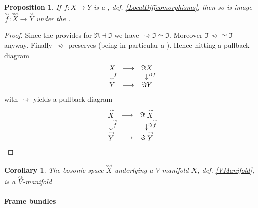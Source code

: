\documentclass[12pt,titlepage]{article}
\def\mathrlap{\mathpalette\mathrlapinternal}
\def\mathrlapinternal#1#2{\rlap{$\mathsurround=0pt#1{#2}$}}
\newcommand{\itexarray}[1]{\begin{matrix}#1\end{matrix}}
\theoremstyle{plain}
\newtheorem{prop}{Proposition}
\newtheorem{cor}{Corollary}
\theoremstyle{definition}
\theoremstyle{remark}
\begin{document}
\begin{prop}
\label{}\hypertarget{}{}
If $f \colon X \longrightarrow Y$ is a , def. \ref{LocalDiffeomorphisms}, then so is image $\stackrel{\rightsquigarrow}{f}\colon \stackrel{\rightsquigarrow}{X} \longrightarrow \stackrel{\rightsquigarrow}{Y}$ under the .
\end{prop}
\begin{proof}
Since the  provides  for $\Re\dashv \Im$ we have $\rightsquigarrow \Im \simeq \Im$. Moreover $\Im \rightsquigarrow \simeq \Im$ anyway. Finally $\rightsquigarrow$ preserves  (being in particular a ). Hence hitting a pullback diagram
\begin{displaymath}
\itexarray{
X &\longrightarrow& \Im X
\\
\downarrow^{\mathrlap{f}} && \downarrow^{\mathrlap{\Im f}}
\\
Y &\longrightarrow& \Im Y
}
\end{displaymath}
with $\rightsquigarrow$ yields a pullback diagram
\begin{displaymath}
\itexarray{
\stackrel{\rightsquigarrow}{X} &\longrightarrow& \Im \stackrel{\rightsquigarrow}{X}
\\
\downarrow^{\mathrlap{\stackrel{\rightsquigarrow}{f}}} && \downarrow^{\mathrlap{\Im \stackrel{\rightsquigarrow}{f}}}
\\
\stackrel{\rightsquigarrow}{Y} &\longrightarrow& \Im \stackrel{\rightsquigarrow}{Y}
}
\end{displaymath}
\end{proof}
\begin{cor}
\label{}\hypertarget{}{}
The bosonic space $\stackrel{\rightsquigarrow}{X}$ underlying a $V$-manifold $X$, def. \ref{VManifold}, is a $\stackrel{\rightsquigarrow}{V}$-manifold
\end{cor}
\hypertarget{FrameBundles}{}\paragraph*{{Frame bundles}}\label{FrameBundles}
\end{document}
